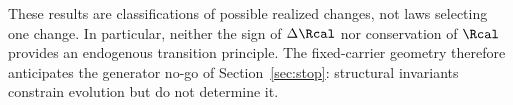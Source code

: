These results are classifications of possible realized changes, not laws selecting one change. In particular, neither the sign of $\Delta\Rcal$ nor conservation of $\Rcal$ provides an endogenous transition principle. The fixed-carrier geometry therefore anticipates the generator no-go of Section~\ref{sec:stop}: structural invariants constrain evolution but do not determine it.
